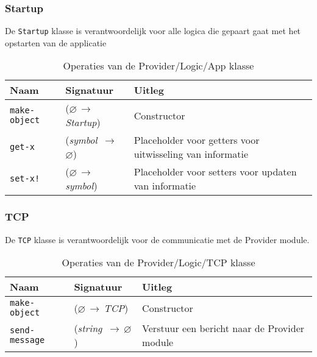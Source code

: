 \documentclass[a4paper, 11pt]{article}
\newcommand{\naar}{\,$\rightarrow$\,}
\renewcommand{\empty}{$\varnothing$}
\newcommand{\<}{\scriptsize\textless\normalsize}
\renewcommand{\>}{\scriptsize\textgreater\normalsize}
\begin{document}
\subsubsection{Startup} %
De \texttt{Startup} klasse is verantwoordelijk voor alle logica die gepaart gaat met het opstarten van de applicatie
\begin{table}[H]
	\begin{center}
		\begin{tabular}{|l l l|}
			\hline
			\textbf{Naam} & \textbf{Signatuur} & \textbf{Uitleg}\\
			\hline
			\texttt{make-object} & (\empty \naar \textit{Startup}) & Constructor\\
			\hline
			\texttt{get-x} & (\textit{symbol} \naar \empty) & Placeholder voor getters voor uitwisseling van informatie\\
			\texttt{set-x!} & (\empty \naar \textit{symbol}) & Placeholder voor setters voor updaten van informatie\\
			\hline
		\end{tabular}
		\caption{Operaties van de Provider/Logic/App klasse}
	\end{center}
\end{table}

\subsubsection{TCP} %
De \texttt{TCP} klasse is verantwoordelijk voor de communicatie met de Provider module.
\begin{table}[H]
	\begin{center}
		\begin{tabular}{|l l l|}
			\hline
			\textbf{Naam} & \textbf{Signatuur} & \textbf{Uitleg}\\
			\hline
			\texttt{make-object} & (\empty \naar \textit{TCP}) & Constructor\\
			\hline
			\texttt{send-message} & (\textit{string} \naar \empty) & Verstuur een bericht naar de Provider module\\
			\hline
		\end{tabular}
		\caption{Operaties van de Provider/Logic/TCP klasse}
	\end{center}
\end{table}

\newpage
\end{document}
